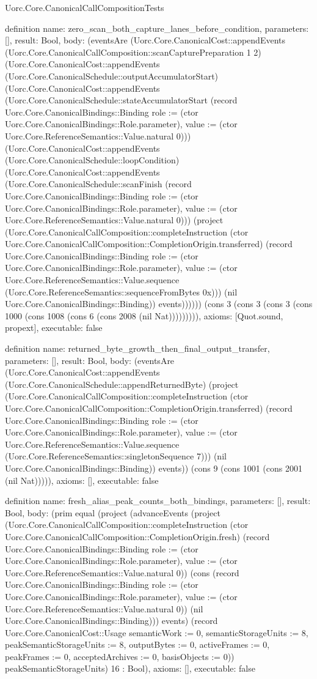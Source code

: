 \begin{lexlean}{Uorc.Core.CanonicalCallCompositionTests}
\begin{semanticmodule}
definition{
  name: zero_scan_both_capture_lanes_before_condition,
  parameters: [],
  result: Bool,
  body: (eventsAre (Uorc.Core.CanonicalCost::appendEvents (Uorc.Core.CanonicalCallComposition::scanCapturePreparation 1 2) (Uorc.Core.CanonicalCost::appendEvents (Uorc.Core.CanonicalSchedule::outputAccumulatorStart) (Uorc.Core.CanonicalCost::appendEvents (Uorc.Core.CanonicalSchedule::stateAccumulatorStart (record Uorc.Core.CanonicalBindings::Binding {role := (ctor Uorc.Core.CanonicalBindings::Role.parameter), value := (ctor Uorc.Core.ReferenceSemantics::Value.natural 0)})) (Uorc.Core.CanonicalCost::appendEvents (Uorc.Core.CanonicalSchedule::loopCondition) (Uorc.Core.CanonicalCost::appendEvents (Uorc.Core.CanonicalSchedule::scanFinish (record Uorc.Core.CanonicalBindings::Binding {role := (ctor Uorc.Core.CanonicalBindings::Role.parameter), value := (ctor Uorc.Core.ReferenceSemantics::Value.natural 0)})) (project (Uorc.Core.CanonicalCallComposition::completeInstruction (ctor Uorc.Core.CanonicalCallComposition::CompletionOrigin.transferred) (record Uorc.Core.CanonicalBindings::Binding {role := (ctor Uorc.Core.CanonicalBindings::Role.parameter), value := (ctor Uorc.Core.ReferenceSemantics::Value.sequence (Uorc.Core.ReferenceSemantics::sequenceFromBytes 0x))}) (nil Uorc.Core.CanonicalBindings::Binding)) events)))))) (cons 3 (cons 3 (cons 3 (cons 1000 (cons 1008 (cons 6 (cons 2008 (nil Nat))))))))),
  axioms: [Quot.sound, propext],
  executable: false
}

definition{
  name: returned_byte_growth_then_final_output_transfer,
  parameters: [],
  result: Bool,
  body: (eventsAre (Uorc.Core.CanonicalCost::appendEvents (Uorc.Core.CanonicalSchedule::appendReturnedByte) (project (Uorc.Core.CanonicalCallComposition::completeInstruction (ctor Uorc.Core.CanonicalCallComposition::CompletionOrigin.transferred) (record Uorc.Core.CanonicalBindings::Binding {role := (ctor Uorc.Core.CanonicalBindings::Role.parameter), value := (ctor Uorc.Core.ReferenceSemantics::Value.sequence (Uorc.Core.ReferenceSemantics::singletonSequence 7))}) (nil Uorc.Core.CanonicalBindings::Binding)) events)) (cons 9 (cons 1001 (cons 2001 (nil Nat))))),
  axioms: [],
  executable: false
}

definition{
  name: fresh_alias_peak_counts_both_bindings,
  parameters: [],
  result: Bool,
  body: (prim equal (project (advanceEvents (project (Uorc.Core.CanonicalCallComposition::completeInstruction (ctor Uorc.Core.CanonicalCallComposition::CompletionOrigin.fresh) (record Uorc.Core.CanonicalBindings::Binding {role := (ctor Uorc.Core.CanonicalBindings::Role.parameter), value := (ctor Uorc.Core.ReferenceSemantics::Value.natural 0)}) (cons (record Uorc.Core.CanonicalBindings::Binding {role := (ctor Uorc.Core.CanonicalBindings::Role.parameter), value := (ctor Uorc.Core.ReferenceSemantics::Value.natural 0)}) (nil Uorc.Core.CanonicalBindings::Binding))) events) (record Uorc.Core.CanonicalCost::Usage {semanticWork := 0, semanticStorageUnits := 8, peakSemanticStorageUnits := 8, outputBytes := 0, activeFrames := 0, peakFrames := 0, acceptedArchives := 0, basisObjects := 0})) peakSemanticStorageUnits) 16 : Bool),
  axioms: [],
  executable: false
}


\end{semanticmodule}
\end{lexlean}
